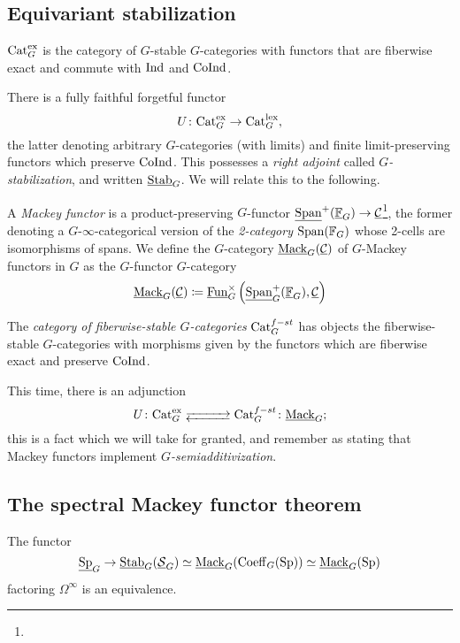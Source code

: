 \documentclass{amsart}
\begin{document}
\subsection{Equivariant stabilization}%
\begin{definition}
  $\mathrm{Cat}_G^{\mathrm{ex}}$ is the category of $G$-stable $G$-categories with functors that are fiberwise exact and commute with $\mathrm{Ind}$ and $\mathrm{CoInd}$.
\end{definition}
There is a fully faithful forgetful functor
\[
  U\colon \mathrm{Cat}_G^{\mathrm{ex}} \rightarrow \mathrm{Cat}_G^{\mathrm{lex}},
\]
the latter denoting arbitrary $G$-categories (with limits) and finite limit-preserving functors which preserve $\mathrm{CoInd}$.
This possesses a \emph{right adjoint} called \emph{$G$-stabilization}, and written $\underline{\operatorname{Stab}}_G$.
We will relate this to the following.
\begin{definition}
  A \emph{Mackey functor} is a product-preserving $G$-functor $\underline{\operatorname{Span}}^+(\underline{\mathbb{F}}_G) \rightarrow \underline{\mathcal{C}}$\footnote{}, the former denoting a $G$-$\infty$-categorical version of the \emph{2-category} $\operatorname{Span}(\mathbb{F}_G)$ whose 2-cells are isomorphisms of spans.
  We define the $G$-category $\underline{\mathrm{Mack}}_G(\underline{\mathcal{C}})$ of $G$-Mackey functors in $G$ as the $G$-functor $G$-category
  \[
    \underline{\mathrm{Mack}}_G(\underline{\mathcal{C}}) \coloneqq \underline{\operatorname{Fun}}_G^{\times}\left( \underline{\operatorname{Span}}^+_G(\underline{\mathbb{F}}_G),\underline{\mathcal{C}} \right)
  \]
\end{definition}

\begin{definition}
  The \emph{category of fiberwise-stable $G$-categories} $\mathrm{Cat}_G^{f-st}$ has objects the fiberwise-stable $G$-categories with morphisms given by the functors which are fiberwise exact and preserve $\mathrm{CoInd}$.
\end{definition}
This time, there is an adjunction
\[
  U\colon \Cat_G^{\ex} \longrightleftarrows \Cat_G^{f-st}\colon  \uMack_G;
\]
this is a fact which we will take for granted, and remember as stating that Mackey functors implement \emph{$G$-semiadditivization}.

\subsection{The spectral Mackey functor theorem}%
\begin{theorem}
  The functor 
  \[
    \underline{\operatorname{Sp}}_G \rightarrow \underline{\operatorname{Stab}}_G(\underline{\mathcal{S}}_G) \simeq \underline{\mathrm{Mack}}_G(\operatorname{Coeff}_G(\operatorname{Sp})) \simeq \underline{\mathrm{Mack}}_G(\operatorname{Sp})
  \]
  factoring $\Omega^\infty$ is an equivalence.
\end{theorem}
\end{document}
